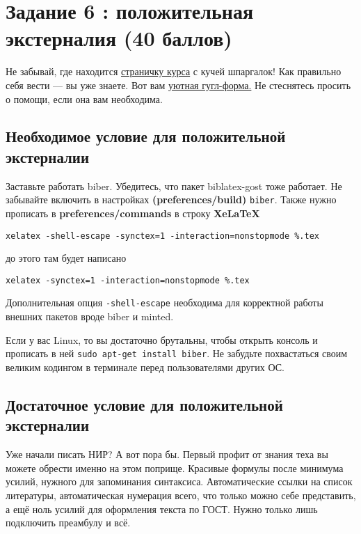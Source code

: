 \documentclass[12pt, a4paper, oneside]{article}
\begin{document}
	
\section*{Задание 6 :  положительная экстерналия (40  баллов) }
	
Не забывай, где находится  \href{https://fulyankin.github.io/LaTeX/}{страничку курса} с кучей шпаргалок! Как правильно себя вести — вы уже знаете. Вот вам \href{https://docs.google.com/forms/d/e/1FAIpQLSe11kxKVfv07iCL1E9yNX7ll9swKImiVwRr1H70lslGzInRSg/viewform}{уютная гугл-форма.}   Не стеснятесь просить о помощи, если она вам необходима.
	

\subsection*{Необходимое условие для положительной экстерналии }

Заставьте работать biber. Убедитесь, что пакет biblatex-gost тоже работает.  Не забывайте включить в настройках \textbf{(preferences/build)}  \texttt{biber}. Также нужно прописать в \textbf{preferences/commands} в строку \textbf{XeLaTeX}

 \texttt{xelatex -shell-escape -synctex=1 -interaction=nonstopmode \%.tex}
 
до этого там будет написано
 
  \texttt{xelatex -synctex=1 -interaction=nonstopmode \%.tex}
  
Дополнительная опция \texttt{-shell-escape} необходима для корректной работы внешних пакетов вроде biber и minted.

Если у вас Linux, то вы достаточно брутальны, чтобы открыть консоль и прописать в ней  \texttt{sudo apt-get install biber}. Не забудьте похвастаться своим великим кодингом в терминале перед пользователями других ОС.

\subsection*{Достаточное условие  для положительной экстерналии}

Уже начали писать НИР? А вот пора бы. Первый профит от знания теха вы можете обрести именно на этом поприще.  Красивые формулы после минимума усилий, нужного для запоминания синтаксиса. Автоматические ссылки на список литературы, автоматическая нумерация всего, что только можно себе представить, а ещё ноль усилий для оформления текста по ГОСТ. Нужно только лишь подключить преамбулу и всё. 
\end{document}
